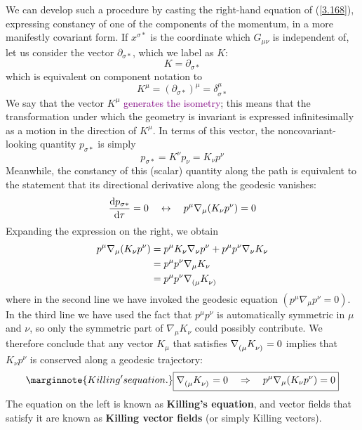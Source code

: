 We can develop such a procedure by casting the right-hand equation of (\ref{3.168}), expressing constancy of one of the components of the momentum, in a more manifestly covariant form. If $x^{\sigma*}$ is the coordinate which $G_{\mu\nu}$ is independent of, let us consider the vector $\partial_{\sigma*}$, which we label as $K$:
\begin{equation*}
    K=\partial_{\sigma*}
\end{equation*}
which is equivalent on component notation  to
\begin{equation*}
    K^\mu=(\partial_{\sigma*})^\mu=\delta^\mu_{\sigma*}
\end{equation*}
We say that the vector $K^\mu$ \textcolor{purple}{generates the isometry}; this means that the transformation under which the geometry is invariant is expressed infinitesimally as a motion in the direction of $K^\mu$. In terms of this vector, the noncovariant-looking quantity $p_{\sigma*}$ is simply
\begin{equation*}
    p_{\sigma*}=K^\nu p_{\nu}=K_\nu p^\nu
\end{equation*}
Meanwhile, the constancy of this (scalar) quantity along the path is equivalent to the statement that its directional derivative along the geodesic vanishes:
\begin{equation*}
    \dv{p_{\sigma*}}{\tau}=0\quad \leftrightarrow\quad p^\mu\nabla_\mu (K_\nu p^\nu)=0
\end{equation*}
Expanding the expression on the right, we obtain
\begin{align*}
    p^\mu\nabla_\mu (K_\nu p^\nu)&=p^\mu K_\nu\nabla_\nu p^\nu + p^\mu p^\nu \nabla_\nu K_\nu\\
    &=p^\mu p^\nu\nabla_\mu K_\nu\\
    &=p^\mu p^\nu \tensor{\nabla}{_{(\mu}}\tensor{K}{_{\nu)}} 
\end{align*}
where in the second line we have invoked the geodesic equation $(p^\mu\nabla_\mu p^\nu=0)$. In the third line we have used the fact that $p^\mu p^\nu$ is automatically symmetric in $\mu$ and $\nu$, so only the symmetric part of $\nabla_\mu K_\nu$ could possibly contribute. We therefore conclude that any vector $K_\mu$ that satisfies $\tensor{\nabla}{_{(\mu}}\tensor{K}{_{\nu)}}=0$ implies that $K_\nu p^\nu$ is conserved along a geodesic trajectory:
\begin{equation}\label{3.174}\marginnote{Killing's equation.}
    \boxed{\tensor{\nabla}{_{(\mu}}\tensor{K}{_{\nu)}}=0\quad \Rightarrow\quad p^\mu\nabla_\mu (K_\nu p^\nu)=0}
\end{equation}
The equation on the left is known as \textbf{Killing's equation}, and vector fields that satisfy it are known as \textbf{Killing vector fields} (or simply Killing vectors).

